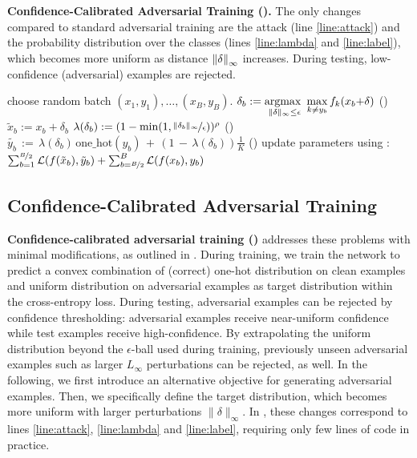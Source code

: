 \begin{algorithm}[t]
	\caption{\textbf{Confidence-Calibrated Adversarial Training (\ConfTrain).}  The only changes compared to standard adversarial training are the attack (line \ref{line:attack}) and the probability distribution over the classes (lines \ref{line:lambda} and \ref{line:label}), which becomes more uniform as distance $\norm{\delta}_\infty$ increases. During testing, low-confidence (adversarial) examples are rejected.}
	\label{alg:main-ccat}
	\begin{algorithmic}[1]
		\STATE choose random batch $(x_1,y_1),\ldots,(x_B,y_B)$.
		\STATE $\delta_b:=\argmax\limits_{\|\delta\|_\infty \leq \epsilon} \max\limits_{k \neq y_b} f_k(x_b{+}\delta)$\label{line:attack} ()
		\STATE $\tilde{x}_b := x_b + \delta_b$
		\STATE $\lambda(\delta_b) := (1 - \min(1, \nicefrac{\|\delta_b\|_\infty}{\epsilon}))^\rho$ ()\label{line:lambda}
		\STATE $\tilde{y_b}\,{:=}\,\lambda(\delta_b)\,\text{one\_hot}(y_b)\,{+}\,(1\,{-}\,\lambda(\delta_b)) \frac{1}{K}$ ()\label{line:label}
		\ENDFOR
		\STATE update parameters using :\\\hspace*{1cm}$\sum_{b = 1}^{\nicefrac{B}{2}} \mathcal{L}(f(\tilde{x}_b), \tilde{y}_b) + \sum_{b = \nicefrac{B}{2}}^{B} \mathcal{L}(f(x_b), y_b)$
		\ENDWHILE
	\end{algorithmic}
\end{algorithm}

\subsection{Confidence-Calibrated Adversarial Training}
\label{subsec:main-ccat}

\textbf{Confidence-calibrated adversarial training (\ConfTrain)} addresses these problems with minimal modifications, as outlined in . During training, we train the network to predict a convex combination of (correct) one-hot distribution on clean examples and uniform distribution on adversarial examples as target distribution within the cross-entropy loss. During testing, adversarial examples can be rejected by confidence thresholding: adversarial examples receive near-uniform confidence while test examples receive high-confidence. By extrapolating the uniform distribution beyond the $\epsilon$-ball used during training, previously unseen adversarial examples such as larger $L_\infty$ perturbations can be rejected, as well. In the following, we first introduce an alternative objective for generating adversarial examples. Then, we specifically define the target distribution, which becomes more uniform with larger perturbations $\|\delta\|_\infty$. In , these changes correspond to lines \ref{line:attack}, \ref{line:lambda} and \ref{line:label}, requiring only few lines of code in practice.

